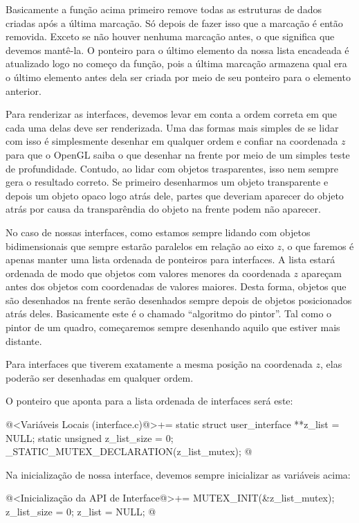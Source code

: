 Basicamente a função acima primeiro remove todas as estruturas de
dados criadas após a última marcação. Só depois de fazer isso que a
marcação é então removida. Exceto se não houver nenhuma marcação
antes, o que significa que devemos mantê-la. O ponteiro para o último
elemento da nossa lista encadeada é atualizado logo no começo da
função, pois a última marcação armazena qual era o último elemento
antes dela ser criada por meio de seu ponteiro para o elemento
anterior.


Para renderizar as interfaces, devemos levar em conta a ordem correta
em que cada uma delas deve ser renderizada. Uma das formas mais
simples de se lidar com isso é simplesmente desenhar em qualquer ordem
e confiar na coordenada $z$ para que o OpenGL saiba o que desenhar na
frente por meio de um simples teste de profundidade. Contudo, ao lidar
com objetos trasparentes, isso nem sempre gera o resultado correto. Se
primeiro desenharmos um objeto transparente e depois um objeto opaco
logo atrás dele, partes que deveriam aparecer do objeto atrás por
causa da transparêndia do objeto na frente podem não aparecer.

No caso de nossas interfaces, como estamos sempre lidando com objetos
bidimensionais que sempre estarão paralelos em relação ao eixo $z$, o
que faremos é apenas manter uma lista ordenada de ponteiros para
interfaces. A lista estará ordenada de modo que objetos com valores
menores da coordenada $z$ apareçam antes dos objetos com coordenadas
de valores maiores. Desta forma, objetos que são desenhados na frente
serão desenhados sempre depois de objetos posicionados atrás
deles. Basicamente este é o chamado ``algoritmo do pintor''. Tal como
o pintor de um quadro, começaremos sempre desenhando aquilo que
estiver mais distante.

Para interfaces que tiverem exatamente a mesma posição na coordenada
$z$, elas poderão ser desenhadas em qualquer ordem.

O ponteiro que aponta para a lista ordenada de interfaces será este:

\iniciocodigo
@<Variáveis Locais (interface.c)@>+=
static struct user_interface **z_list = NULL;
static unsigned z_list_size = 0;
_STATIC_MUTEX_DECLARATION(z_list_mutex);
@
\fimcodigo

Na inicialização de nossa interface, devemos sempre inicializar as
variáveis acima:

\iniciocodigo
@<Inicialização da API de Interface@>+=
MUTEX_INIT(&z_list_mutex);
z_list_size = 0;
z_list = NULL;
@
\fimcodigo

